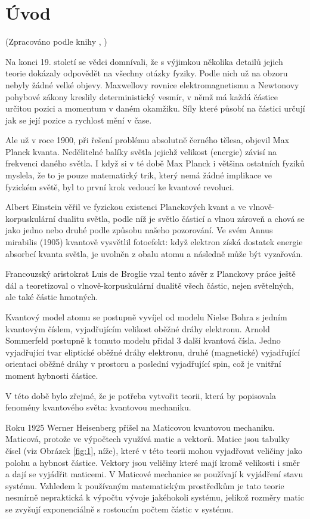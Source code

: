 \section{Úvod}
(Zpracováno podle knihy \citeauthor{quantum}, \citeyear{quantum})

Na konci 19. století se vědci domnívali, že s výjimkou několika detailů jejich teorie dokázaly odpovědět na všechny otázky fyziky. Podle nich už na obzoru nebyly žádné velké objevy. Maxwellovy rovnice elektromagnetismu a Newtonovy pohybové zákony kreslily deterministický vesmír, v němž má každá částice určitou pozici a momentum v daném okamžiku. Síly které působí na částici určují jak se její pozice a rychlost mění v čase.

Ale už v roce 1900, při řešení problému absolutně černého tělesa, objevil Max Planck kvanta. Nedělitelné balíky světla jejichž velikost (energie) závisí na frekvenci daného světla. I když si v té době Max Planck i většina ostatních fyziků myslela, že to je pouze matematický trik, který nemá žádné implikace ve fyzickém světě, byl to první krok vedoucí ke kvantové revoluci.

Albert Einstein věřil ve fyzickou existenci Planckových kvant a ve vlnově-korpusku\-lární dualitu světla, podle níž je světlo částicí a vlnou zároveň a chová se jako jedno nebo druhé podle způsobu našeho pozorování. Ve svém Annus mirabilis (1905) kvantově vysvětlil fotoefekt: když elektron získá dostatek energie absorbcí kvanta světla, je uvolněn z obalu atomu a následně může být vyzařován.

Francouzský aristokrat Luis de Broglie vzal tento závěr z Planckovy práce ještě dál a teoretizoval o vlnově-korpuskulární dualitě všech částic, nejen světelných, ale také částic hmotných.

Kvantový model atomu se postupně vyvíjel od modelu Nielse Bohra s jedním kvantovým číslem, vyjadřujícím velikost oběžné dráhy elektronu. Arnold Sommerfeld postupně k tomuto modelu přidal 3 další kvantová čísla. Jedno vyjadřující tvar eliptické oběžné dráhy elektronu, druhé (magnetické) vyjadřující orientaci oběžné dráhy v prostoru a poslední vyjadřující spin, což je vnitřní moment hybnosti částice.

V této době bylo zřejmé, že je potřeba vytvořit teorii, která by popisovala fenomény kvantového světa: kvantovou mechaniku.

Roku 1925 Werner Heisenberg přišel na Maticovou kvantovou mechaniku. Maticová, protože ve výpočtech využívá matic a vektorů. Matice jsou tabulky čísel (viz Obrázek \ref{fig:1}, níže), které v této teorii mohou vyjadřovat veličiny jako polohu a hybnost částice. Vektory jsou veličiny které mají kromě velikosti i směr a dají se vyjádřit maticemi. V Maticové mechanice se používají k vyjádření stavu systému. Vzhledem k používaným matematickým prostředkům je tato teorie nesmírně nepraktická k výpočtu vývoje jakéhokoli systému, jelikož rozměry matic se zvyšují exponenciálně s rostoucím počtem částic v systému.

